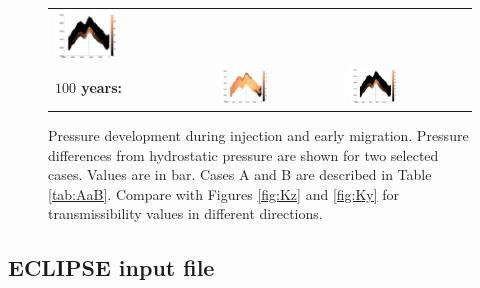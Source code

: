 \begin{figure}
\begin{tabular}{MMM}
\includegraphics[width=0.4\textwidth]{./figurer/C03211p50_slcy}\\
\textbf{$100$ years:}&
\includegraphics[width=0.4\textwidth]{./figurer/C02222p100_slcy}&
\includegraphics[width=0.4\textwidth]{./figurer/C03211p100_slcy}\\
\end{tabular}
\caption{Pressure development during injection and early migration. Pressure differences from hydrostatic pressure are shown for two selected cases. Values are in bar. Cases A and B are described in Table \ref{tab:AaB}. Compare with Figures \ref{fig:Kz} and \ref{fig:Ky} for transmissibility values in different directions.}
\label{fig:COplume}
\end{figure}

\subsection{ECLIPSE input file}
\label{eclDataFile}

